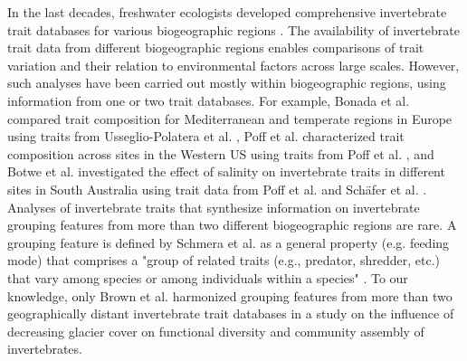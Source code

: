 \documentclass{article}
\begin{document}
In the last decades, freshwater ecologists developed comprehensive invertebrate trait databases for various biogeographic regions \cite{usseglio-polatera_biomonitoring_2000, schmidt-kloiber_www.freshwaterecology.info_2015, vieira_database_nodate, Philips_and_Smith_NZ_DB_2018, kefford_integrated_2020, tomanova_trophic_2006}. The availability of invertebrate trait data from different biogeographic regions enables comparisons of trait variation and their relation to environmental factors across large scales. However, such analyses have been carried out mostly within biogeographic regions, using information from one or two trait databases. For example, Bonada et al. \cite{bonada_taxonomic_2007} compared trait composition for Mediterranean and temperate regions in Europe using traits from Usseglio-Polatera et al. \cite{usseglio-polatera_biomonitoring_2000}, Poff et al. \cite{poff_developing_2010} characterized trait composition across sites in the Western US using traits from Poff et al. \cite{poff_functional_2006}, and Botwe et al. \cite{botwe_effects_2018} investigated the effect of salinity on invertebrate traits in different sites in South Australia using trait data from Poff et al. \cite{poff_functional_2006} and Schäfer et al. \cite{schafer_trait_2011}. 
Analyses of invertebrate traits that synthesize information on invertebrate grouping features from more than two different biogeographic regions are rare. A grouping feature is defined by Schmera et al. as a general property (e.g. feeding mode) that comprises a "group of related traits (e.g., predator, shredder, etc.) that vary among species or among individuals within a species" \cite{schmera_proposed_2015}. To our knowledge, only Brown et al. \cite{brown_functional_2018} harmonized grouping features from more than two geographically distant invertebrate trait databases in a study on the influence of decreasing glacier cover on functional diversity and community assembly of invertebrates. 
\end{document}
